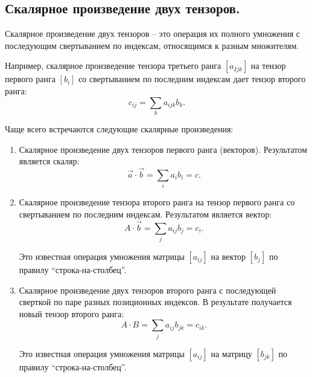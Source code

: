 \subsection{Скалярное произведение двух тензоров.}

	Скалярное произведение двух тензоров -- это операция их полного умножения с последующим свертыванием по индексам, относящимся к разным множителям.
	
	Например, скалярное произведение тензора третьего ранга \( [a_{Ijk}] \) на тензор первого ранга \( [b_i] \) со свертыванием по последним индексам дает тензор второго ранга:
	\[ c_{ij} = \sum\limits_k a_{ijk}b_k. \]
	
	Чаще всего встречаются следующие скалярные произведения:
	\begin{enumerate}
	\item Скалярное произведение двух тензоров первого ранга (векторов). Результатом является скаляр:
		\[ \vec{a}\cdot\vec{b} = \sum\limits_i a_ib_i = c. \]
		
	\item Скалярное произведение тензора второго ранга на тензор первого ранга со свертыванием по последним индексам. Результатом является вектор:
		\[ A\cdot\vec{b} = \sum\limits_j a_{ij}b_j= c_i. \]
		
		Это известная операция умножения матрицы \( [a_{ij}] \) на вектор \( [b_j] \) по правилу ``строка-на-столбец''.
		
	\item Скалярное произведение двух тензоров второго ранга с последующей сверткой по паре разных позиционных индексов. В результате получается новый тензор второго ранга:
		\[ A\cdot B = \sum\limits_j a_{ij}b_{jk} = c_{ik}. \]
		
		Это известная операция умножения матрицы \( [a_{ij}] \) на матрицу \( [b_{jk}] \) по правилу ``строка-на-столбец''.
	\end{enumerate}
